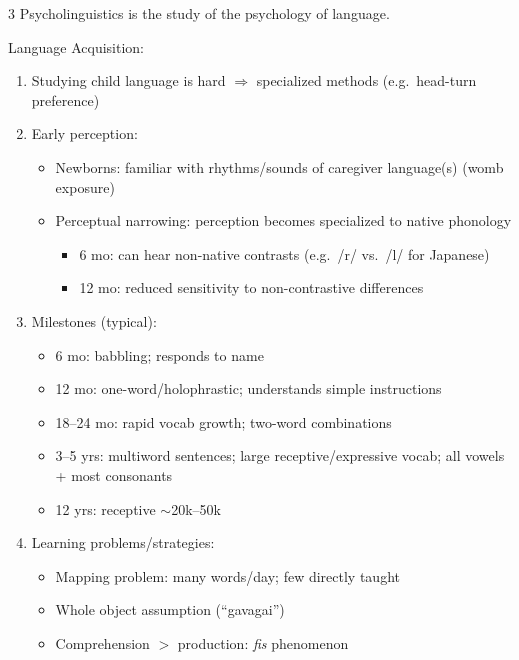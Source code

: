 \documentclass[12pt, a4paper]{article}
\begin{document}
\begin{multicols*}{3}
Psycholinguistics is the study of the psychology of language.

Language Acquisition:
\begin{enumerate}[\roman*.]
  \item Studying child language is hard $\Rightarrow$ specialized methods (e.g.\ head-turn preference)
  \item Early perception:
    \begin{itemize}[leftmargin=*]\vspace{3pt}
      \item Newborns: familiar with rhythms/sounds of caregiver language(s) (womb exposure)
      \item Perceptual narrowing: perception becomes specialized to native phonology
        \begin{itemize}[leftmargin=*]\vspace{2pt}
          \item 6 mo: can hear non-native contrasts (e.g.\ /r/ vs.\ /l/ for Japanese)
          \item 12 mo: reduced sensitivity to non-contrastive differences
        \end{itemize}
    \end{itemize}
  \item Milestones (typical):
    \begin{itemize}[leftmargin=*]\vspace{3pt}
      \item 6 mo: babbling; responds to name
      \item 12 mo: one-word/holophrastic; understands simple instructions
      \item 18--24 mo: rapid vocab growth; two-word combinations
      \item 3--5 yrs: multiword sentences; large receptive/expressive vocab; all vowels + most consonants
      \item 12 yrs: receptive $\sim$20k--50k
    \end{itemize}
  \item Learning problems/strategies:
    \begin{itemize}[leftmargin=*]\vspace{3pt}
      \item Mapping problem: many words/day; few directly taught
      \item Whole object assumption (``gavagai'')
      \item Comprehension $>$ production: \textit{fis} phenomenon
    \end{itemize}
\end{enumerate}


\end{multicols*}
\end{document}
